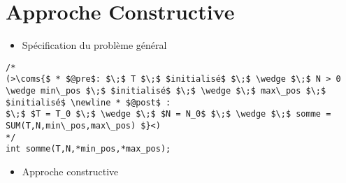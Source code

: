 \section{Approche Constructive}
\begin{itemize}
\item[\textbullet] Spécification du problème général
\end{itemize}
\begin{lstlisting}
/*
(>\coms{$ * $@pre$: $\;$ T $\;$ $initialisé$ $\;$ \wedge $\;$ N > 0 \wedge min\_pos $\;$ $initialisé$ $\;$ \wedge $\;$ max\_pos $\;$ $initialisé$ \newline * $@post$ : 
$\;$ $T = T_0 $\;$ \wedge $\;$ $N = N_0$ $\;$ \wedge $\;$ somme = SUM(T,N,min\_pos,max\_pos) $}<)
*/
int somme(T,N,*min_pos,*max_pos);
\end{lstlisting}
\newline
\begin{itemize}
    \item[\textbullet] Approche constructive
\newline
\end{itemize}
